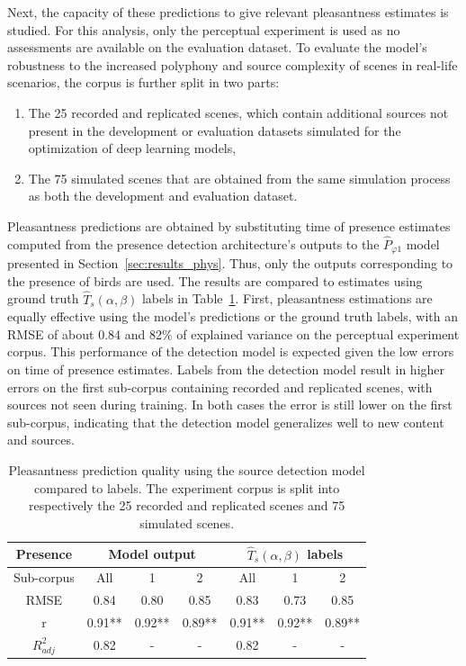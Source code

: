 \documentclass[11pt,a4paper]{article}
\begin{document}
Next, the capacity of these predictions to give relevant pleasantness estimates is studied. For this analysis, only the perceptual experiment is used as no assessments are available on the evaluation dataset. To evaluate the model's robustness to the increased polyphony and source complexity of scenes in real-life scenarios, the corpus is further split in two parts:
\begin{enumerate}
\item The 25 recorded and replicated scenes, which contain additional sources not present in the development or evaluation datasets simulated for the optimization of deep learning models,
\item The 75 simulated scenes that are obtained from the same simulation process as both the development and evaluation dataset.
\end{enumerate}
Pleasantness predictions are obtained by substituting time of presence estimates computed from the presence detection architecture's outputs to the $\hat P_{\varphi 1}$ model presented in Section~\ref{sec:results_phys}. Thus, only the outputs corresponding to the presence of birds are used. The results are compared to estimates using ground truth $\hat T_s(\alpha, \beta)$ labels in Table~\ref{tab:pppred}. First, pleasantness estimations are equally effective using the model's predictions or the ground truth labels, with an RMSE of about 0.84 and 82\% of explained variance on the perceptual experiment corpus. This performance of the detection model is expected given the low errors on time of presence estimates. Labels from the detection model result in higher errors on the first sub-corpus containing recorded and replicated scenes, with sources not seen during training. In both cases the error is still lower on the first sub-corpus, indicating that the detection model generalizes well to new content and sources.\\

\begin{table}[t]
\centering
\caption{Pleasantness prediction quality using the source detection model compared to labels. The experiment corpus is split into respectively the 25 recorded and replicated scenes and 75 simulated scenes.}
\label{tab:pppred}
\begin{tabular}{ c | c c c | c c c }
\hline
	Presence & \multicolumn{3}{|c}{Model output} & \multicolumn{3}{|c}{$\hat T_s(\alpha, \beta)$ labels} \\ \hline
	Sub-corpus & All & 1 & 2 & All & 1 & 2 \\ \hline
	RMSE & 0.84 & 0.80 & 0.85 & 0.83 & 0.73 & 0.85 \\ \hline
	r & 0.91** & 0.92** & 0.89** & 0.91** & 0.92** & 0.89** \\ \hline
	$R^2_{adj}$ & 0.82 & - & - & 0.82 & - & - \\ \hline
\end{tabular}
\end{table}
\end{document}
